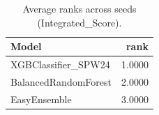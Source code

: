 \begin{table}[t]
\centering
\begin{tabular}{lr}
\toprule
Model & rank \\
\midrule
XGBClassifier_SPW24 & 1.0000 \\
BalancedRandomForest & 2.0000 \\
EasyEnsemble & 3.0000 \\
\bottomrule
\end{tabular}
\caption{Average ranks across seeds (Integrated_Score).}
\label{tab:avg_rank_Integrated_Score}
\end{table}